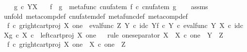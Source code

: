 \begin{isabellebody}
\ \ \ {\isachardoublequoteopen}g\ {\isasymin}\isactrlsub c\ Y\isactrlbsup X\isactrlesup {\isachardoublequoteclose}\isanewline
\ \ \ {\isachardoublequoteopen}f\ {\isasymbox}\ g\ {\isacharequal}{\kern0pt}\ metafunc\ {\isacharparenleft}{\kern0pt}{\isacharparenleft}{\kern0pt}cnufatem\ f{\isacharparenright}{\kern0pt}\ {\isasymcirc}\isactrlsub c\ {\isacharparenleft}{\kern0pt}cnufatem\ g{\isacharparenright}{\kern0pt}{\isacharparenright}{\kern0pt}{\isachardoublequoteclose}\isanewline
%
\isadelimproof
\ \ %
\endisadelimproof
%
\isatagproof
{}\isamarkupfalse%
\ assms\isanewline
{}\isamarkupfalse%
{\isacharparenleft}{\kern0pt}unfold\ meta{\isacharunderscore}{\kern0pt}comp{}{\isacharunderscore}{\kern0pt}def{}\ cnufatem{\isacharunderscore}{\kern0pt}def{}\ metafunc{\isacharunderscore}{\kern0pt}def\ meta{\isacharunderscore}{\kern0pt}comp{\isacharunderscore}{\kern0pt}def{\isacharparenright}{\kern0pt}\ \ \ \ \ \ \ \ \ \ \isanewline
\ \ \isamarkupfalse%
\ {\isachardoublequoteopen}f\isactrlsup {\isasymflat}\ {\isasymcirc}\isactrlsub c\ {\isasymlangle}g\isactrlsup {\isasymflat}{\isacharcomma}{\kern0pt}right{\isacharunderscore}{\kern0pt}cart{\isacharunderscore}{\kern0pt}proj\ X\ one{\isasymrangle}\ {\isacharequal}{\kern0pt}\ {\isacharparenleft}{\kern0pt}{\isacharparenleft}{\kern0pt}eval{\isacharunderscore}{\kern0pt}func\ Z\ Y\ {\isasymcirc}\isactrlsub c\ {\isasymlangle}id\isactrlsub c\ Y{\isacharcomma}{\kern0pt}f\ {\isasymcirc}\isactrlsub c\ {\isasymbeta}\isactrlbsub Y\isactrlesub {\isasymrangle}{\isacharparenright}{\kern0pt}\ {\isasymcirc}\isactrlsub c\ eval{\isacharunderscore}{\kern0pt}func\ Y\ X\ {\isasymcirc}\isactrlsub c\ {\isasymlangle}id\isactrlsub c\ X{\isacharcomma}{\kern0pt}g\ {\isasymcirc}\isactrlsub c\ {\isasymbeta}\isactrlbsub X\isactrlesub {\isasymrangle}{\isacharparenright}{\kern0pt}\ {\isasymcirc}\isactrlsub c\ \ left{\isacharunderscore}{\kern0pt}cart{\isacharunderscore}{\kern0pt}proj\ X\ one{\isachardoublequoteclose}\isanewline
\ \ \isamarkupfalse%
{\isacharparenleft}{\kern0pt}rule\ one{\isacharunderscore}{\kern0pt}separator{\isacharbrackleft}{\kern0pt}\ X\ {\isacharequal}{\kern0pt}\ {\isachardoublequoteopen}X\ {\isasymtimes}\isactrlsub c\ one{\isachardoublequoteclose}{\isacharcomma}{\kern0pt}\ \ Y\ {\isacharequal}{\kern0pt}\ Z{\isacharbrackright}{\kern0pt}{\isacharparenright}{\kern0pt}\isanewline
\ \ \ \ \isamarkupfalse%
\ {\isachardoublequoteopen}f\isactrlsup {\isasymflat}\ {\isasymcirc}\isactrlsub c\ {\isasymlangle}g\isactrlsup {\isasymflat}{\isacharcomma}{\kern0pt}right{\isacharunderscore}{\kern0pt}cart{\isacharunderscore}{\kern0pt}proj\ X\ one{\isasymrangle}\ {\isacharcolon}{\kern0pt}\ X\ {\isasymtimes}\isactrlsub c\ one\ {\isasymrightarrow}\ Z{\isachardoublequoteclose}\isanewline

\end{isabellebody}
